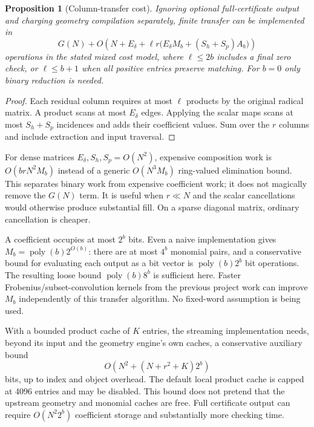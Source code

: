 \documentclass[11pt]{article}
\newtheorem{proposition}[theorem]{Proposition}
\theoremstyle{definition}\newtheorem{definition}[theorem]{Definition}
\theoremstyle{remark}\newtheorem{remark}[theorem]{Remark}
\begin{document}
\begin{proposition}[Column-transfer cost]\label{prop:cost}
Ignoring optional full-certificate output and charging geometry compilation
separately, finite transfer can be implemented in
\begin{equation}\label{eq:kernelcost}
 G(N)+O\!\left(N+E_\delta+
 \ell r\bigl(E_\delta M_b+(S_h+S_p)A_b\bigr)\right)
\end{equation}
operations in the stated mixed cost model, where $\ell\le2b$ includes a final
zero check, or $\ell\le b+1$ when all positive entries preserve matching.
For $b=0$ only binary reduction is needed.
\end{proposition}
\begin{proof}
Each residual column requires at most $\ell$ products by the original radical
matrix. A product scans at most $E_\delta$ edges. Applying the scalar maps scans
at most $S_h+S_p$ incidences and adds their coefficient values. Sum over the $r$
columns and include extraction and input traversal.
\end{proof}

For dense matrices $E_\delta,S_h,S_p=O(N^2)$, expensive composition work is
$O(brN^2M_b)$ instead of a generic $O(N^3M_b)$ ring-valued elimination bound.
This separates binary work from expensive coefficient work; it does not magically
remove the $G(N)$ term. It is useful when $r\ll N$ and the scalar cancellations
would otherwise produce substantial fill. On a sparse diagonal matrix, ordinary
cancellation is cheaper.

A coefficient occupies at most $2^b$ bits. Even a naive implementation gives
$M_b=\operatorname{poly}(b)2^{O(b)}$: there are at most $4^b$ monomial pairs,
and a conservative bound for evaluating each output as a bit vector is
$\operatorname{poly}(b)2^b$ bit operations. The resulting loose bound
$\operatorname{poly}(b)8^b$ is sufficient here. Faster Frobenius/subset-convolution
kernels from the previous project work can improve $M_b$ independently of this
transfer algorithm. No fixed-word assumption is being used.

With a bounded product cache of $K$ entries, the streaming implementation needs,
beyond its input and the geometry engine's own caches, a conservative auxiliary
bound
\[
 O\!\left(N^2+(N+r^2+K)2^b\right)
\]
bits, up to index and object overhead. The default local product cache is capped
at 4096 entries and may be disabled. This bound does not pretend that the upstream
geometry and monomial caches are free. Full certificate output can require
$O(N^2 2^b)$ coefficient storage and substantially more checking time.
\end{document}
